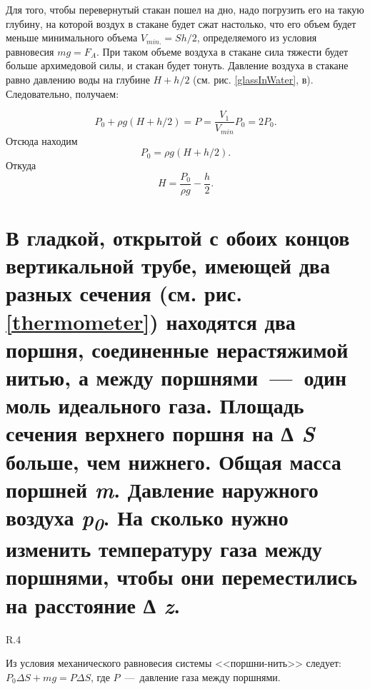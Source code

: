 Для того, чтобы перевернутый стакан пошел на дно, надо погрузить его на такую глубину, на которой воздух в стакане будет сжат настолько, что его объем будет меньше минимального объема $V_{min.} = Sh/2$, определяемого из условия равновесия $mg = F_A$. При таком объеме воздуха в стакане сила тяжести будет больше архимедовой силы, и стакан будет тонуть. Давление воздуха в стакане равно давлению воды на глубине $H + h/2$ (см. рис. \ref{glassInWater}, в). Следовательно, получаем:

\begin{equation}
  P_0 + \rho g(H + h/2) = P = \frac{V_1}{V_{min}}P_0 = 2 P_0.
\end{equation}
Отсюда находим 
\begin{equation}
  P_0 = \rho g(H + h/2).
\end{equation}
Откуда 
\begin{equation}
  H = \frac{P_0}{\rho g} - \frac{h}{2}. 
\end{equation}

\section{В гладкой, открытой с обоих концов вертикальной трубе, имеющей два разных сечения (см. рис. \ref{thermometer}) находятся два поршня, соединенные нерастяжимой нитью, а между поршнями~---~один моль идеального газа. Площадь сечения верхнего поршня на \emph{∆ S} больше, чем нижнего.
Общая масса поршней \emph{m}. Давление наружного воздуха
\emph{p\textsubscript{0}}. На сколько нужно изменить температуру газа
между поршнями, чтобы они переместились на расстояние \emph{∆ z}.}

\solving{}

\begin{wrapfigure}[9]{R}{.4\textwidth}
  \centering
  \caption{}
  \label{thermometer}
\end{wrapfigure}
Из условия механического равновесия системы <<поршни-нить>> следует: $P_0\Delta S + mg = P\Delta S$, где $P$~---~давление газа между поршнями.

